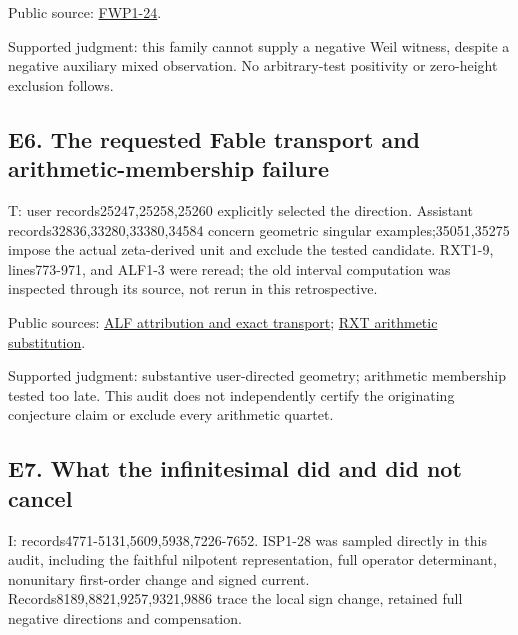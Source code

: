 \documentclass[
  british,
  11pt,
  a4paper,
]{article}
\begin{document}
Public source:
\href{https://github.com/KokunoYumeto/zeta-function-research-reader/blob/e1dc06aa68bb810cf7d8b0006942f5b036b8b765/workbenches/splitzero-tandem/continuations/20260923-full-prime-support/033/MIXED_PRIME_ENERGY_AND_BOUNDARY.tex\#L663}{FWP1-24}.

Supported judgment: this family cannot supply a negative Weil witness,
despite a negative auxiliary mixed observation. No arbitrary-test
positivity or zero-height exclusion follows.

\subsection{E6. The requested Fable transport and arithmetic-membership
failure}\label{e6.-the-requested-fable-transport-and-arithmetic-membership-failure}

T: user records25247,25258,25260 explicitly selected the direction.
Assistant records32836,33280,33380,34584 concern geometric singular
examples;35051,35275 impose the actual zeta-derived unit and exclude the
tested candidate. RXT1-9, lines773-971, and ALF1-3 were reread; the old
interval computation was inspected through its source, not rerun in this
retrospective.

Public sources:
\href{https://github.com/KokunoYumeto/zeta-function-research-reader/blob/39ced92952a9c807d51500783b221beb141da3b6/workbenches/splitzero-tandem/continuations/20260921-actual-xi-uniform/ALPOGE_FABLE_ROLE.tex\#L5}{ALF
attribution and exact transport};
\href{https://github.com/KokunoYumeto/zeta-function-research-reader/blob/39ced92952a9c807d51500783b221beb141da3b6/workbenches/splitzero-tandem/continuations/20260921-actual-xi-uniform/ACTUAL_XI_UNIFORM_CONDUCTOR.tex\#L773}{RXT
arithmetic substitution}.

Supported judgment: substantive user-directed geometry; arithmetic
membership tested too late. This audit does not independently certify
the originating conjecture claim or exclude every arithmetic quartet.

\subsection{E7. What the infinitesimal did and did not
cancel}\label{e7.-what-the-infinitesimal-did-and-did-not-cancel}

I: records4771-5131,5609,5938,7226-7652. ISP1-28 was sampled directly in
this audit, including the faithful nilpotent representation, full
operator determinant, nonunitary first-order change and signed current.
Records8189,8821,9257,9321,9886 trace the local sign change, retained
full negative directions and compensation.
\end{document}
